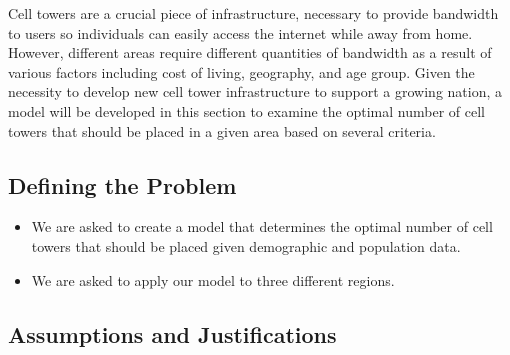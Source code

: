 \documentclass[12pt]{article}
\begin{document}
Cell towers are a crucial piece of infrastructure, necessary to provide bandwidth to users so individuals can easily access the internet while away from home. However, different areas require different quantities of bandwidth as a result of various factors including cost of living, geography, and age group. Given the necessity to develop new cell tower infrastructure to support a growing nation, a model will be developed in this section to examine the optimal number of cell towers that should be placed in a given area based on several criteria.

\subsection{Defining the Problem}
\begin{itemize}
\item We are asked to create a model that determines the optimal number of cell towers that should be placed given demographic and population data.
\item We are asked to apply our model to three different regions.
\end{itemize}

\subsection{Assumptions and Justifications}
\end{document}
